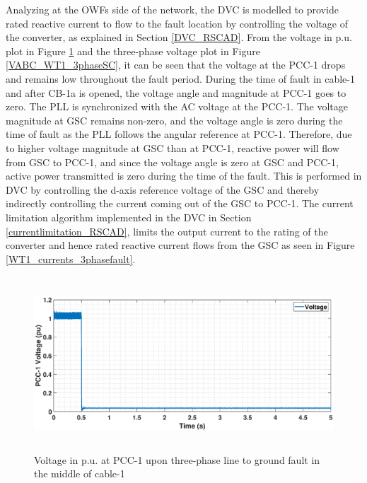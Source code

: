 Analyzing at the \gls{OWF}s side of the network, the \gls{DVC} is modelled to provide rated reactive current to flow to the fault location by controlling the voltage of the converter, as explained in Section \ref{DVC_RSCAD}. From the voltage in p.u. plot in Figure \ref{VACP_WT1_3phaseSC} and the three-phase voltage plot in Figure \ref{VABC_WT1_3phaseSC}, it can be seen that the voltage at the \gls{PCC}-1 drops and remains low throughout the fault period. During the time of fault in cable-1 and after CB-1a is opened, the voltage angle and magnitude at \gls{PCC}-1 goes to zero. The \gls{PLL} is synchronized with the \gls{AC} voltage at the \gls{PCC}-1. The voltage magnitude at \gls{GSC} remains non-zero, and the voltage angle is zero during the time of fault as the \gls{PLL} follows the angular reference at \gls{PCC}-1. Therefore, due to higher voltage magnitude at \gls{GSC} than at \gls{PCC}-1, reactive power will flow from \gls{GSC} to \gls{PCC}-1, and since the voltage angle is zero at \gls{GSC} and \gls{PCC}-1, active power transmitted is zero during the time of the fault. This is performed in \gls{DVC} by controlling the d-axis reference voltage of the \gls{GSC} and thereby indirectly controlling the current coming out of the \gls{GSC} to \gls{PCC}-1. The current limitation algorithm implemented in the \gls{DVC} in Section \ref{currentlimitation_RSCAD}, limits the output current to the rating of the converter and hence rated reactive current flows from the \gls{GSC} as seen in Figure \ref{WT1_currents_3phasefault}.



\begin{figure}[H]
    \includegraphics[height = 6.5cm,width = \textwidth]{Diagrams/Chapter_5/VACP_WT1_3phaseSC.eps}
    \caption{Voltage in p.u. at PCC-1 upon three-phase line to ground fault in the middle of cable-1}
    \label{VACP_WT1_3phaseSC}
\end{figure}

